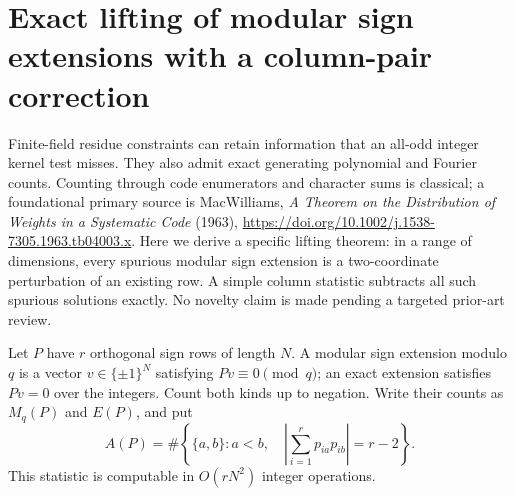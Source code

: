 \section{Exact lifting of modular sign extensions with a column-pair correction}
\label{sec:modular-sign-lifting}

Finite-field residue constraints can retain information that an
all-odd integer kernel test misses. They also admit exact generating
polynomial and Fourier counts. Counting through code enumerators and
character sums is classical; a foundational primary source is
MacWilliams, \emph{A Theorem on the Distribution of Weights in a
Systematic Code} (1963),
\url{https://doi.org/10.1002/j.1538-7305.1963.tb04003.x}.
Here we derive a specific lifting theorem: in a range of dimensions,
every spurious modular sign extension is a two-coordinate perturbation
of an existing row. A simple column statistic subtracts all such
spurious solutions exactly. No novelty claim is made pending a
targeted prior-art review.

Let $P$ have $r$ orthogonal sign rows of length $N$. A modular sign
extension modulo $q$ is a vector $v\in\{\pm1\}^N$ satisfying
$Pv\equiv0\pmod q$; an exact extension satisfies $Pv=0$ over the
integers. Count both kinds up to negation. Write their counts as
$M_q(P)$ and $E(P)$, and put
\[
 A(P)=\#\left\{\{a,b\}:a<b,\quad
 \left|\sum_{i=1}^r p_{ia}p_{ib}\right|=r-2\right\}.
\]
This statistic is computable in $O(rN^2)$ integer operations.

